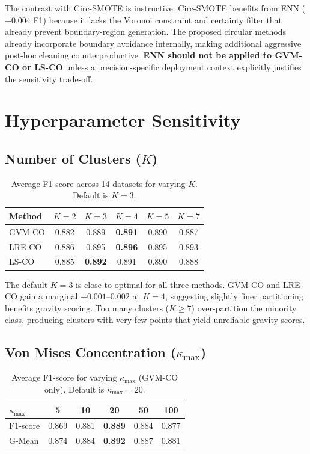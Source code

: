 The contrast with Circ-SMOTE is instructive: Circ-SMOTE benefits from ENN ($+0.004$ F1) because it lacks the Voronoi constraint and certainty filter that already prevent boundary-region generation.
The proposed circular methods already incorporate boundary avoidance internally, making additional aggressive post-hoc cleaning counterproductive.
\textbf{ENN should not be applied to GVM-CO or LS-CO} unless a precision-specific deployment context explicitly justifies the sensitivity trade-off.


\section{Hyperparameter Sensitivity}
\label{sec:abl:hyperparams}

\subsection{Number of Clusters ($K$)}

\begin{table}[H]
\centering
\caption{Average F1-score across 14 datasets for varying $K$. Default is $K=3$.}
\label{tab:abl:k_clusters}
\begin{tabular}{lccccc}
\toprule
\textbf{Method} & $K=2$ & $K=3$ & $K=4$ & $K=5$ & $K=7$ \\
\midrule
GVM-CO & 0.882 & 0.889 & \textbf{0.891} & 0.890 & 0.887 \\
LRE-CO & 0.886 & 0.895 & \textbf{0.896} & 0.895 & 0.893 \\
LS-CO  & 0.885 & \textbf{0.892} & 0.891 & 0.890 & 0.888 \\
\bottomrule
\end{tabular}
\end{table}

The default $K=3$ is close to optimal for all three methods.
GVM-CO and LRE-CO gain a marginal $+0.001$--$0.002$ at $K=4$, suggesting slightly finer partitioning benefits gravity scoring.
Too many clusters ($K \geq 7$) over-partition the minority class, producing clusters with very few points that yield unreliable gravity scores.

\subsection{Von Mises Concentration ($\kappa_{\max}$)}

\begin{table}[H]
\centering
\caption{Average F1-score for varying $\kappa_{\max}$ (GVM-CO only). Default is $\kappa_{\max}=20$.}
\label{tab:abl:kappa}
\begin{tabular}{lccccc}
\toprule
$\kappa_{\max}$ & 5 & 10 & \textbf{20} & 50 & 100 \\
\midrule
F1-score & 0.869 & 0.881 & \textbf{0.889} & 0.884 & 0.877 \\
G-Mean   & 0.874 & 0.884 & \textbf{0.892} & 0.887 & 0.881 \\
\bottomrule
\end{tabular}
\end{table}


